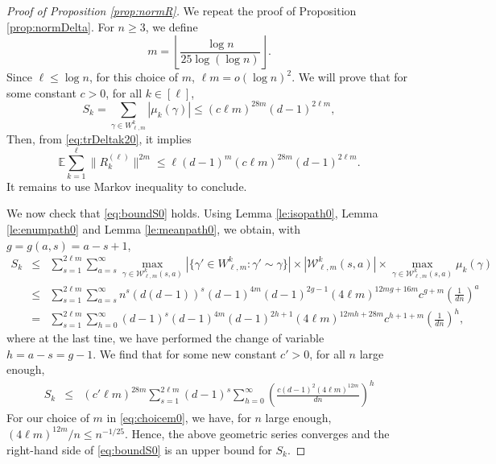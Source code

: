 \documentclass[11pt]{article}
\newcommand{\dE}{\mathbb {E}}
\newcommand{\cW}{\mathcal {W}}
\newcommand{\PAR}[1]{{{\left(#1\right)}}} %
\newcommand{\1}{1\!\!{\sf I}}\newcommand{\IND}{\1}
\begin{document}
\begin{proof}[Proof of Proposition \ref{prop:normR}]
We repeat the proof of Proposition  \ref{prop:normDelta}. For $n \geq 3$, we define 
\begin{equation}\label{eq:choicem0}
m = \left\lfloor  \frac{ \log n }{25 \log (\log n)} \right\rfloor.
\end{equation}
Since $\ell \leq \log n$, for this choice of $m$, $\ell m = o ( \log n) ^2$. We will  prove that for some constant $c>0$, for all $ k \in [\ell]$,
\begin{equation}\label{eq:boundS0}
S_k = \sum_{\gamma \in W^k_{\ell,m} }   | \mu_k(\gamma) | \leq (c \ell  m )^{28 m} (d-1)^{2\ell m},
\end{equation}
Then, from \eqref{eq:trDeltak20}, it implies 
$$
\dE  \sum_{k=1} ^\ell \| R^{(\ell)}_{k}  \| ^{2 m} \leq \ell (d-1)^{m}   (c \ell  m )^{28 m} (d-1)^{2\ell m}.
$$  
It remains to use Markov inequality to conclude.

We now check that  \eqref{eq:boundS0} holds. Using Lemma \ref{le:isopath0}, Lemma \ref{le:enumpath0} and Lemma \ref{le:meanpath0}, we obtain, with $g = g(a,s) = a - s+1$,
\begin{eqnarray*}
S_k & \leq & \sum_{s = 1}^{2\ell m} \sum_{a = s } ^{\infty} \max_{ \gamma \in \cW^k_{\ell,m} (s,a)} |\{ \gamma' \in W^k_{\ell,m} : \gamma' \sim \gamma \} | \times  |\cW^k_{\ell,m} (s,a) | \times  \max_{ \gamma \in \cW^k_{\ell,m} (s,a)} \mu_k(\gamma)  \\
& \leq &  \sum_{s=1}^{2\ell m} \sum_{a = s} ^{ \infty } n^s ( d (d-1) ) ^s (d-1)^{4m} (d-1)^{2g-1}   (4 \ell  m )^{12 m g + 16 m} c^{g +  m } \PAR{\frac{ 1}{dn} }^a     \nonumber\\
& = &   \sum_{s=1}^{2 \ell m} \sum_{h=0} ^{ \infty }   (d-1)  ^s (d-1)^{4m}   (d-1)^{2h+1}    (4 \ell  m )^{12 m h + 28 m} c^{h + 1 + m} \PAR{\frac{ 1}{dn} }^{ h}  , 
 \end{eqnarray*}
where at the last tine, we have performed the change of variable $h = a - s = g -1$. We find that for some new constant $c' >0$, for all $n$ large enough,
\begin{eqnarray*}
S_k &\leq &   (c'  \ell  m )^{28 m}   \sum_{s=1}^{ 2 \ell  m } (d-1)^{s} \sum_{h = 0} ^{\infty} \PAR{\frac{ c (d-1)^2 (4 \ell m) ^{12 m} }{ dn } }^{h}
\end{eqnarray*}
For our choice of $m$ in \eqref{eq:choicem0}, we have, for $n$ large enough, 
$
   (4 \ell m) ^{12 m} /  n   \leq n^{-1/25}. 
$
Hence, the above geometric series converges  and  the right-hand side of \eqref{eq:boundS0} is an upper bound for $S_k$. 
\end{proof}
\end{document}
